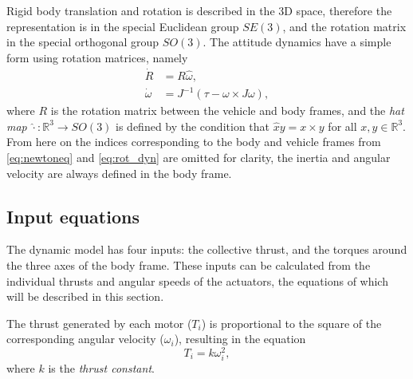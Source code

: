 Rigid body translation and rotation is described in the 3D space, therefore the representation is in the special Euclidean group $SE(3)$, and the rotation matrix in the special orthogonal group $SO(3)$. The attitude dynamics have a simple form using rotation matrices, namely
\begin{align}
    \dot{R} & = R\hat{\omega},\label{eq:rot1}\\
    \dot{\omega} & = J^{-1}\left(\tau - \omega\times J \omega\right),\label{eq:rot2}
\end{align}
where $R$ is the rotation matrix between the vehicle and body frames, and the \textit{hat map} $\hat{\cdot}:\mathbb{R}^3\rightarrow SO(3)$ is defined by the condition that $\hat{x}y = x\times y$ for all $x,y\in \mathbb{R}^3$. From here on the indices corresponding to the body and vehicle frames from \eqref{eq:newtoneq} and \eqref{eq:rot_dyn} are omitted for clarity, the inertia and angular velocity are always defined in the body frame. %


\subsection{Input equations}


The dynamic model has four inputs: the collective thrust, and the torques around the three axes of the body frame. These inputs can be calculated from the individual thrusts and angular speeds of the actuators, the equations of which will be described in this section.

The thrust generated by each motor ($T_i$) is proportional to the square of the corresponding angular velocity ($\omega_i$), resulting in the equation
\begin{equation}
T_i = k\omega_i^2,\label{eq:thrustconstant}
\end{equation}
where $k$ is the \textit{thrust constant}. 

